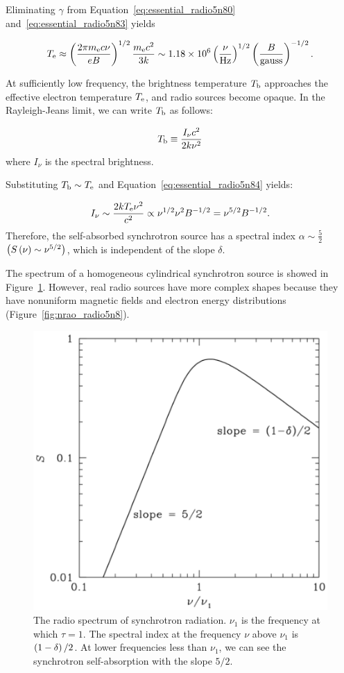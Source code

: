 Eliminating $\gamma$ from Equation~\ref{eq:essential_radio5n80} and~\ref{eq:essential_radio5n83} yields

\begin{equation}\label{eq:essential_radio5n84}
    T_{\mathrm{e}} \approx \left(\frac{2 \pi m_{\mathrm{e}} c \nu}{e B}\right)^{1 / 2} \frac{m_{\mathrm{e}} c^2}{3 k} \sim 1.18 \times 10^6\left(\frac{\nu}{\mathrm{Hz}}\right)^{1/2}\left(\frac{B}{\mathrm{gauss}}\right)^{-1/2}.
\end{equation}

At sufficiently low frequency, the brightness temperature $T_{\mathrm{b}}$ approaches the effective electron temperature $T_{\mathrm{e}}$, and radio sources become opaque.
In the Rayleigh-Jeans limit, we can write $T_{\mathrm{b}}$ as follows:

\begin{equation}\label{eq:essential_radio5n87}
    T_{\mathrm{b}} \equiv \frac{I_{\nu}c^2}{2k\nu^2}
\end{equation}
where $I_{\nu}$ is the spectral brightness.

Substituting $T_{\mathrm{b}} \sim T_{\mathrm{e}}$ and Equation~\ref{eq:essential_radio5n84} yields:

\begin{equation}\label{eq:essential_radio5n88}
    I_{\nu} \sim \frac{2kT_{\mathrm{e}}\nu^2}{c^2} \propto \nu^{1/2}\nu^2 B^{-1/2} = \nu^{5/2} B^{-1/2}.
\end{equation}
Therefore, the self-absorbed synchrotron source has a spectral index $\alpha\sim\frac{5}{2}$ $\left(S\left(\nu\right) \sim \nu^{5/2}\right)$, which is independent of the slope $\delta$.

The spectrum of a homogeneous cylindrical synchrotron source is showed in Figure~\ref{fig:nrao_radio5n7}.
However, real radio sources have more complex shapes because they have nonuniform magnetic fields and electron energy distributions (Figure~\ref{fig:nrao_radio5n8}).

\begin{figure}[htbp]
	\centering
	\includegraphics[width=.6\linewidth]{Chapter_2/Figures/NRAO_radio5n7.png}
    \caption[The spectrum of synchrotron radiation]{\label{fig:nrao_radio5n7}
        The radio spectrum of synchrotron radiation.
        $\nu_1$ is the frequency at which $\tau=1$.
        The spectral index at the frequency $\nu$ above $\nu_1$ is $\left(1-\delta\right)/2$.
        At lower frequencies less than $\nu_1$, we can see the synchrotron self-absorption with the slope $5/2$.
    }
\end{figure}



